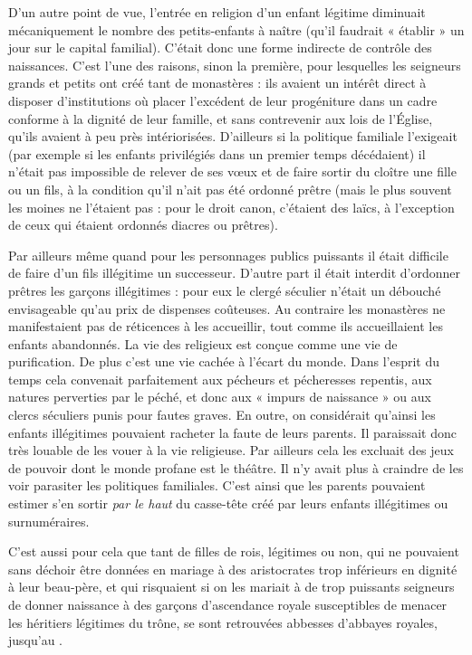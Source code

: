  D'un autre point de vue, l'entrée en religion d'un enfant légitime diminuait mécaniquement le nombre des petits-enfants à naître (qu'il faudrait « établir » un jour sur le capital familial). C'était donc une forme indirecte de contrôle des naissances. C'est l'une des raisons, sinon la première, pour lesquelles les seigneurs grands et petits ont créé tant de monastères : ils avaient un intérêt direct à disposer d'institutions où placer l'excédent de leur progéniture dans un cadre conforme à la dignité de leur famille, et sans contrevenir aux lois de l'Église, qu'ils avaient à peu près intériorisées. D'ailleurs si la politique familiale l'exigeait (par exemple si les enfants privilégiés dans un premier temps décédaient) il n'était pas impossible de relever de ses vœux et de faire sortir du cloître une fille ou un fils, à la condition qu'il n'ait pas été ordonné prêtre (mais le plus souvent les moines ne l'étaient pas : pour le droit canon, c'étaient des laïcs, à l'exception de ceux qui étaient ordonnés diacres ou prêtres).

 Par ailleurs même quand pour les personnages publics puissants il était difficile de faire d'un fils illégitime un successeur. D'autre part il était interdit d'ordonner prêtres les garçons illégitimes : pour eux le clergé séculier n'était un débouché envisageable qu'au prix de dispenses coûteuses. Au contraire les monastères ne manifestaient pas de réticences à les accueillir, tout comme ils accueillaient les enfants abandonnés. La vie des religieux est conçue comme une vie de purification. De plus c'est une vie cachée à l'écart du monde. Dans l'esprit du temps cela convenait parfaitement aux pécheurs et pécheresses repentis, aux natures perverties par le péché, et donc aux « impurs de naissance » ou aux clercs séculiers punis pour fautes graves. En outre, on considérait qu'ainsi les enfants illégitimes pouvaient racheter la faute de leurs parents. Il paraissait donc très louable de les vouer à la vie religieuse. Par ailleurs cela les excluait des jeux de pouvoir dont le monde profane est le théâtre. Il n'y avait plus à craindre de les voir parasiter les politiques familiales. C'est ainsi que les parents pouvaient estimer s'en sortir \emph{par le haut} du casse-tête créé par leurs enfants illégitimes ou surnuméraires.
 
 C'est aussi pour cela que tant de filles de rois, légitimes ou non, qui ne pouvaient sans déchoir être données en mariage à des aristocrates trop inférieurs en dignité à leur beau-père, et qui risquaient si on les mariait à de trop puissants seigneurs de donner naissance à des garçons d'ascendance royale susceptibles de menacer les héritiers légitimes du trône, se sont retrouvées abbesses d'abbayes royales, jusqu'au . 

